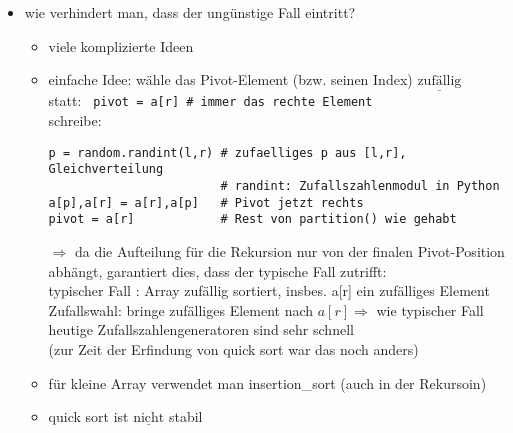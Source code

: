 \begin{itemize}
    \item wie verhindert man, dass der ungünstige Fall eintritt?
    \begin{itemize}
        \item viele komplizierte Ideen
        \item einfache Idee: wähle das Pivot-Element (bzw. seinen Index) $\underline{\text{zufällig}}$ \\
        statt: \verb| pivot = a[r] # immer das rechte Element | \\
        schreibe:
        \begin{verbatim}
p = random.randint(l,r) # zufaelliges p aus [l,r], Gleichverteilung
                        # randint: Zufallszahlenmodul in Python
a[p],a[r] = a[r],a[p]   # Pivot jetzt rechts
pivot = a[r]            # Rest von partition() wie gehabt
        \end{verbatim}
        $\Rightarrow$ da die Aufteilung für die Rekursion nur von der finalen Pivot-Position abhängt, garantiert dies, dass der typische Fall zutrifft: \\
        typischer Fall : Array zufällig sortiert, insbes. a[r] ein zufälliges Element \\
        Zufallswahl: bringe zufälliges Element nach $a[r] \Rightarrow$ wie typischer Fall \\
        heutige Zufallszahlengeneratoren sind sehr schnell \\
        (zur Zeit der Erfindung von quick sort war das noch anders)
        \item für kleine Array verwendet man insertion\_sort (auch in der Rekursoin)
        \item quick sort ist $\underline{\text{nicht}}$ stabil
    \end{itemize}
\end{itemize}

